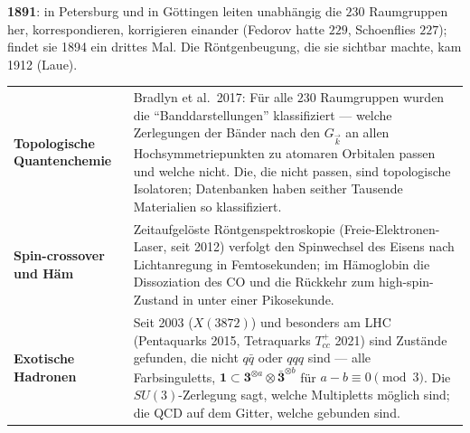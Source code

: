 \begin{geschichte}
\textbf{1891}:  in Petersburg und  in Göttingen leiten unabhängig die $230$ Raumgruppen her, korrespondieren, korrigieren einander (Fedorov hatte $229$, Schoenflies $227$);  findet sie 1894 ein drittes Mal. Die Röntgenbeugung, die sie sichtbar machte, kam 1912 (Laue).

\begin{center}
\begin{minipage}{0.9\textwidth}
\end{minipage}
\end{center}
\end{geschichte}

\begin{forschung}
\begin{center}
{\small
\renewcommand{\arraystretch}{1.45}
\begin{tabular}{@{}P{3.0cm}P{5.2cm}@{}}
\toprule
\textbf{Topologische Quantenchemie} & Bradlyn et al.\ 2017: Für alle $230$ Raumgruppen wurden die \enquote{Banddarstellungen} klassifiziert --- welche Zerlegungen der Bänder nach den $G_{\vec k}$ an allen Hochsymmetriepunkten zu atomaren Orbitalen passen und welche nicht. Die, die nicht passen, sind topologische Isolatoren; Datenbanken haben seither Tausende Materialien so klassifiziert.\\
\textbf{Spin-crossover und Häm} & Zeitaufgelöste Röntgenspektroskopie (Freie-Elektronen-Laser, seit 2012) verfolgt den Spinwechsel des Eisens nach Lichtanregung in Femtosekunden; im Hämoglobin die Dissoziation des $\mathrm{CO}$ und die Rückkehr zum high-spin-Zustand in unter einer Pikosekunde.\\
\textbf{Exotische Hadronen} & Seit 2003 ($X(3872)$) und besonders am LHC (Pentaquarks 2015, Tetraquarks $T_{cc}^{+}$ 2021) sind Zustände gefunden, die nicht $q\bar q$ oder $qqq$ sind --- alle Farbsinguletts, $\mathbf 1\subset\mathbf 3^{\otimes a}\otimes\bar{\mathbf 3}^{\otimes b}$ für $a - b\equiv0\pmod3$. Die $SU(3)$-Zerlegung sagt, welche Multipletts möglich sind; die QCD auf dem Gitter, welche gebunden sind.\\
\bottomrule
\end{tabular}}
\end{center}
\end{forschung}

